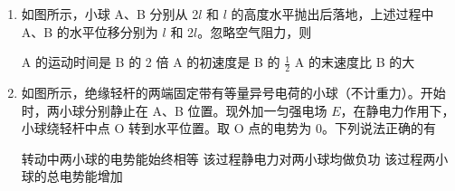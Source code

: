 \documentclass[\gkver]{gaokaozhenti}
\begin{document}
\begin{enumerate}
{C．根据 $F_{\text{向}}=G\frac{Mm}{r^{2}}$，两颗人造卫星质量相等，可得 $\frac{F_{\text{向甲}}}{F_{\text{向乙}}}=\frac{r_{\text{乙}}^{2}}{r_{\text{甲}}^{2}}=\frac{1}{4}$，故 C 正确；

D．两卫星均绕地球做圆周运动，根据开普勒第三定律 $\frac{r^{3}}{T^{2}}=k$，可得 $\frac{T_{\text{甲}}}{T_{\text{乙}}}=\sqrt{\frac{r_{\text{甲}}^{3}}{r_{\text{乙}}^{3}}}=2\sqrt{2}$，故 D 正确。

故选 CD。
}

\item
如图所示，小球 A、B 分别从 2$l$ 和 $l$ 的高度水平抛出后落地，上述过程中 A、B 的水平位移分别为 $l$ 和 2$l$。忽略空气阻力，则


{A 的运动时间是 B 的 2 倍}
{A 的初速度是 B 的 $\frac{1}{2}$}
{A 的末速度比 B 的大}


\item
如图所示，绝缘轻杆的两端固定带有等量异号电荷的小球（不计重力）。开始时，两小球分别静止在 A、B 位置。现外加一匀强电场 $E$，在静电力作用下，小球绕轻杆中点 O 转到水平位置。取 O 点的电势为 0。下列说法正确的有


{转动中两小球的电势能始终相等}
{该过程静电力对两小球均做负功}
{该过程两小球的总电势能增加}

\end{enumerate}
\end{document}
